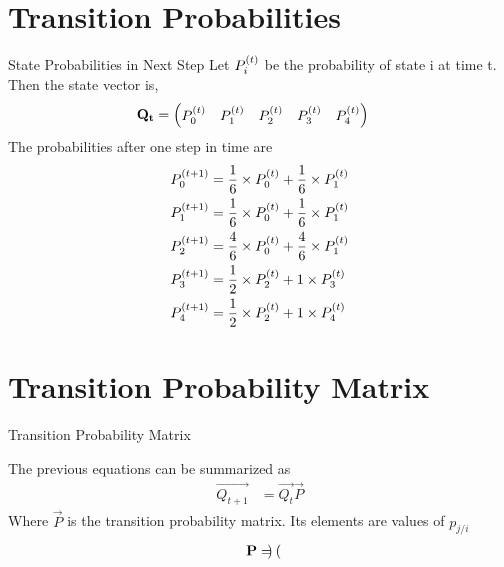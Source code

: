 \documentclass{beamer}
\begin{document}
\section{Transition Probabilities}
\begin{frame}{State Probabilities in Next Step}
    Let $P_{i}^{\left(t\right)} $ be the probability of state i at time t. 
    Then the state vector is,
    \begin{align}
        \mathbf{Q_t} &= \begin{pmatrix}P_{0}^{\left(t\right)}  & P_{1}^{\left(t\right)}  & P_{2}^{\left(t\right)}  & P_{3}^{\left(t\right)}  & P_{4}^{\left(t\right)}  \end{pmatrix}
    \end{align}    
    The probabilities after one step in time are
    \begin{align}
       P_{0}^{\left(t+1\right)}  &= \frac{1}{6} \times P_{0}^{\left(t\right)}  + \frac{1}{6} \times P_{1}^{\left(t\right)}  \\
       P_{1}^{\left(t+1\right)}  &= \frac{1}{6} \times P_{0}^{\left(t\right)}  + \frac{1}{6} \times P_{1}^{\left(t\right)}  \\
       P_{2}^{\left(t+1\right)}  &= \frac{4}{6} \times P_{0}^{\left(t\right)}  + \frac{4}{6} \times P_{1}^{\left(t\right)}  \\
       P_{3}^{\left(t+1\right)}  &= \frac{1}{2} \times P_{2}^{\left(t\right)}  + 1 \times P_{3}^{\left(t\right)}  \\
       P_{4}^{\left(t+1\right)}  &= \frac{1}{2} \times P_{2}^{\left(t\right)}  + 1 \times P_{4}^{\left(t\right)}  
    \end{align}
\end{frame}
\section{Transition Probability Matrix}
\begin{frame}{Transition Probability Matrix}

    The previous equations can be summarized as
    \begin{align}
        \vec{Q_{t+1}} &= \vec{Q_t} \vec{P}  
        \label{eq:transtition}
    \end{align}
    Where $\vec{P}$ is the transition probability matrix. Its elements are values of $p_{j/i}$
    \begin{align}
        \mathbf{P}= \begin{pmatrix}\end{pmatrix} 
    \end{align}
\end{frame}
\end{document}
